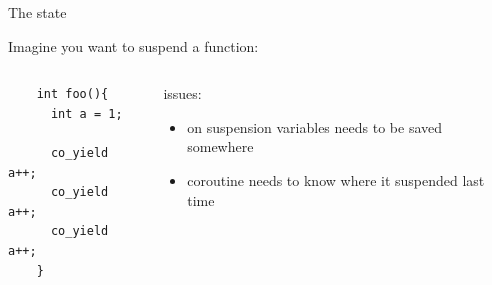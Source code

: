 \documentclass[10pt]{beamer}
\begin{document}

\begin{frame}[fragile]{The state}

\centerline{Imagine you want to suspend a function:}

\vfill

\begin{columns}
\begin{column}{0.48\linewidth}
\begin{verbatim}
    int foo(){
      int a = 1;

      co_yield a++;
      co_yield a++;
      co_yield a++;
    }
\end{verbatim}
\end{column}
\pause
\begin{column}{0.48\linewidth}

\centerline{issues:}

\begin{itemize}[<+- |alert@+>]
  \item on suspension variables needs to be saved somewhere
  \item coroutine needs to know where it suspended last time
\end{itemize}

\end{column}
\end{columns}
\end{frame}
\end{document}
